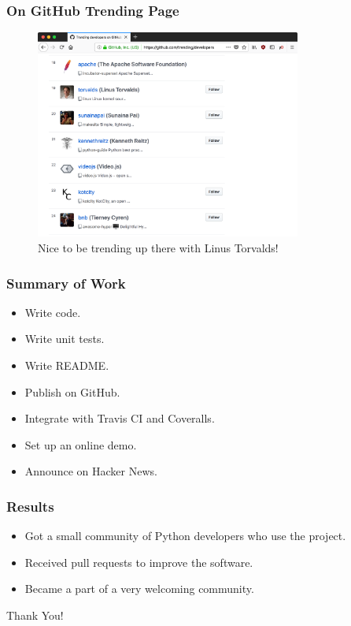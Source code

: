 \documentclass{beamer}
\begin{document}
\begin{frame}
    \frametitle{On GitHub Trending Page}

    \begin{figure}
        \centering
        \includegraphics[height=2.7in]{sunaina-trending.png}
        \caption{
            Nice to be trending up there with Linus Torvalds!
        }
    \end{figure}

\end{frame}


\begin{frame}
    \frametitle{Summary of Work}
    \begin{itemize}
        \item Write code.
        \item Write unit tests.
        \item Write README.
        \item Publish on GitHub.
        \item Integrate with Travis CI and Coveralls.
        \item Set up an online demo.
        \item Announce on Hacker News.
    \end{itemize}
\end{frame}


\begin{frame}
    \frametitle{Results}
    \begin{itemize}
        \item Got a small community of Python developers who use the project.
        \item Received pull requests to improve the software.
        \item Became a part of a very welcoming community.
    \end{itemize}
\end{frame}


\begin{frame}
    \begin{center}
        \Huge
        Thank You!
    \end{center}
\end{frame}
\end{document}
